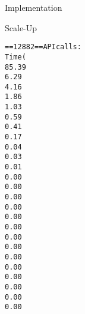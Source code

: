 \documentclass{article}
\begin{document}
\begin{section}{Implementation}
\begin{subsection}{Scale-Up}
\begin{paragraph}{}
\begin{alltt}
          ==12882== API calls:
          Time(%)      Time     Calls       Avg       Min       Max  Name
          85.39%  1.33983s      2054  652.30us  4.1210us  337.62ms  cuStreamSynchronize
          6.29%  98.630ms         1  98.630ms  98.630ms  98.630ms  cuDevicePrimaryCtxRetain
          4.16%  65.316ms         1  65.316ms  65.316ms  65.316ms  cuDevicePrimaryCtxRelease
          1.86%  29.147ms      5144  5.6660us  5.0490us  325.27us  cuMemcpyDtoDAsync
          1.03%  16.215ms         1  16.215ms  16.215ms  16.215ms  cuMemHostAlloc
          0.59%  9.2858ms         1  9.2858ms  9.2858ms  9.2858ms  cuMemFreeHost
          0.41%  6.4971ms      2049  3.1700us  2.9330us  23.480us  cuMemcpyHtoDAsync
          0.17%  2.7347ms     10288     265ns     211ns  2.7000us  cuPointerGetAttributes
          0.04%  695.98us         4  174.00us  3.9990us  241.37us  cuMemAlloc
          0.03%  409.59us         1  409.59us  409.59us  409.59us  cuMemAllocHost
          0.01%  149.14us         1  149.14us  149.14us  149.14us  cuModuleLoadData
          0.00%  32.707us         4  8.1760us  6.7910us  10.511us  cuLaunchKernel
          0.00%  21.719us         1  21.719us  21.719us  21.719us  cuStreamCreate
          0.00%  20.038us         1  20.038us  20.038us  20.038us  cuMemcpyDtoHAsync
          0.00%  5.6230us         2  2.8110us     454ns  5.1690us  cuEventCreate
          0.00%  2.5610us         1  2.5610us  2.5610us  2.5610us  cuEventRecord
          0.00%  2.2920us         3     764ns     163ns  1.7650us  cuDeviceGetCount
          0.00%  1.8190us         3     606ns     293ns  1.0710us  cuCtxSetCurrent
          0.00%  1.3030us         3     434ns     272ns     731ns  cuDeviceGet
          0.00%  1.1740us         1  1.1740us  1.1740us  1.1740us  cuModuleGetFunction
          0.00%  1.1310us         4     282ns     250ns     338ns  cuDeviceGetAttribute
          0.00%  1.0130us         1  1.0130us  1.0130us  1.0130us  cuEventSynchronize
          0.00%     317ns         1     317ns     317ns     317ns  cuMemFree
          0.00%     292ns         1     292ns     292ns     292ns  cuCtxGetCurrent
          0.00%     289ns         1     289ns     289ns     289ns  cuDeviceComputeCapability


\end{alltt}
\end{paragraph}
\end{subsection}
\end{section}
\end{document}
